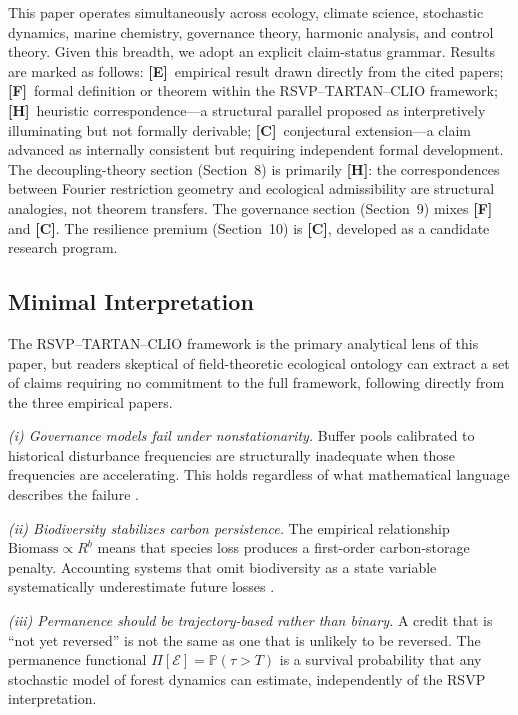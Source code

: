 \documentclass[12pt]{article}
\newcommand{\Ecal}{\mathcal{E}}
\begin{document}
This paper operates simultaneously across ecology, climate science, stochastic dynamics,
marine chemistry, governance theory, harmonic analysis, and control theory. Given this
breadth, we adopt an explicit claim-status grammar. Results are marked as follows:
\textbf{[E]}~empirical result drawn directly from the cited papers; \textbf{[F]}~formal
definition or theorem within the RSVP--TARTAN--CLIO framework; \textbf{[H]}~heuristic
correspondence---a structural parallel proposed as interpretively illuminating but not
formally derivable; \textbf{[C]}~conjectural extension---a claim advanced as internally
consistent but requiring independent formal development. The decoupling-theory section
(Section~8) is primarily \textbf{[H]}: the correspondences between Fourier restriction
geometry and ecological admissibility are structural analogies, not theorem transfers.
The governance section (Section~9) mixes \textbf{[F]} and \textbf{[C]}. The resilience
premium (Section~10) is \textbf{[C]}, developed as a candidate research program.

\subsection*{Minimal Interpretation}

The RSVP--TARTAN--CLIO framework is the primary analytical lens of this paper, but
readers skeptical of field-theoretic ecological ontology can extract a set of claims
requiring no commitment to the full framework, following directly from the three
empirical papers.

\textit{(i) Governance models fail under nonstationarity.} Buffer pools calibrated to
historical disturbance frequencies are structurally inadequate when those frequencies are
accelerating. This holds regardless of what mathematical language describes the failure
\citep{Wu2026}.

\textit{(ii) Biodiversity stabilizes carbon persistence.} The empirical relationship
$\mathrm{Biomass}\propto R^b$ means that species loss produces a first-order carbon-storage
penalty. Accounting systems that omit biodiversity as a state variable systematically
underestimate future losses \citep{Weiskopf2024}.

\textit{(iii) Permanence should be trajectory-based rather than binary.} A credit that
is ``not yet reversed'' is not the same as one that is unlikely to be reversed. The
permanence functional $\Pi[\Ecal]=\mathbb{P}(\tau>T)$ is a survival probability that any
stochastic model of forest dynamics can estimate, independently of the RSVP interpretation.
\end{document}
